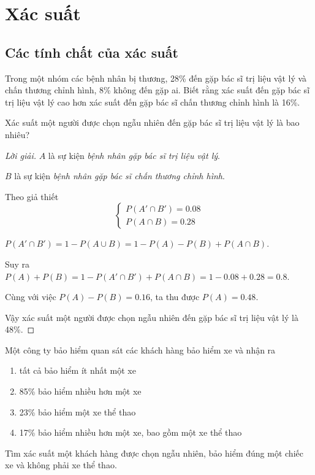 \documentclass[class=probandstats,crop=false]{standalone}
\begin{document}
\chapter{Xác suất}

\section{Các tính chất của xác suất}

\begin{exercise}
    \par Trong một nhóm các bệnh nhân bị thương, 28\% đến gặp bác sĩ trị liệu vật lý và chấn thương chỉnh hình, 8\% không đến gặp ai. Biết rằng xác suất đến gặp bác sĩ trị liệu vật lý cao hơn xác suất đến gặp bác sĩ chấn thương chỉnh hình là 16\%.
    \par Xác suất một người được chọn ngẫu nhiên đến gặp bác sĩ trị liệu vật lý là bao nhiêu?
\end{exercise}

\begin{proof}[Lời giải]
    \par $A$ là sự kiện \textit{bệnh nhân gặp bác sĩ trị liệu vật lý}.
    \par $B$ là sự kiện \textit{bệnh nhân gặp bác sĩ chấn thương chỉnh hình}.
    \bigskip
    \par Theo giả thiết
    \[
        \begin{cases}
            P(A'\cap B') = 0.08 \\
            P(A\cap B) = 0.28
        \end{cases}
    \]
    \par $P(A'\cap B') = 1 - P(A\cup B) = 1 - P(A) - P(B) + P(A\cap B)$.
    \par Suy ra $P(A) + P(B) = 1 - P(A'\cap B') + P(A\cap B) = 1 - 0.08 + 0.28 = 0.8$.
    \par Cùng với việc $P(A) - P(B) = 0.16$, ta thu được $P(A) = 0.48$.
    \par Vậy xác suất một người được chọn ngẫu nhiên đến gặp bác sĩ trị liệu vật lý là 48\%.
\end{proof}

\begin{exercise}
    \par Một công ty bảo hiểm quan sát các khách hàng bảo hiểm xe và nhận ra
    \begin{enumerate}[label = (\alph*)]
        \item tất cả bảo hiểm ít nhất một xe
        \item 85\% bảo hiểm nhiều hơn một xe
        \item 23\% bảo hiểm một xe thể thao
        \item 17\% bảo hiểm nhiều hơn một xe, bao gồm một xe thể thao
    \end{enumerate}
    \par Tìm xác suất một khách hàng được chọn ngẫu nhiên, bảo hiểm đúng một chiếc xe và không phải xe thể thao.
\end{exercise}
\end{document}
